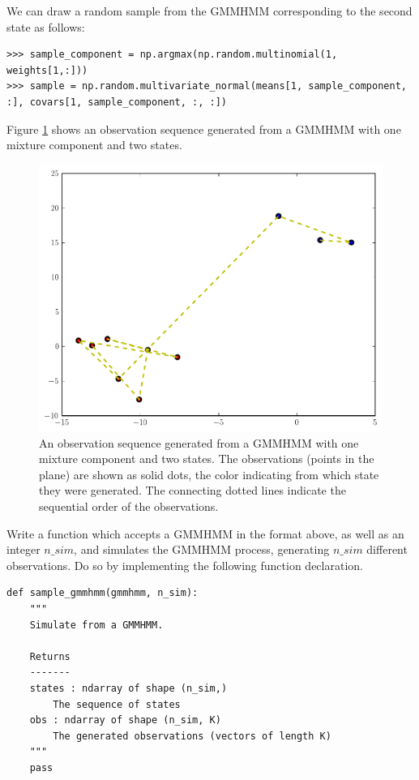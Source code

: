 We can draw a random sample from the GMMHMM corresponding to the second state as follows:
\begin{lstlisting}
>>> sample_component = np.argmax(np.random.multinomial(1, weights[1,:]))
>>> sample = np.random.multivariate_normal(means[1, sample_component, :], covars[1, sample_component, :, :])
\end{lstlisting}

Figure \ref{fig:samples} shows an observation sequence generated from a GMMHMM with one mixture component and two states.

\begin{figure}
\centering
\includegraphics[width=\textwidth]{samples}
\caption{An observation sequence generated from a GMMHMM with one mixture component and two states.
The observations (points in the plane) are shown as solid dots, the color indicating from which
state they were generated. The connecting dotted lines indicate the sequential order of the observations.}
\label{fig:samples}
\end{figure}

\begin{problem}
Write a function which accepts a GMMHMM in the format above, as well as an integer $n\_sim$, and simulates the GMMHMM process, generating $n\_sim$ different observations.
Do so by implementing the following function declaration.
\begin{lstlisting}
def sample_gmmhmm(gmmhmm, n_sim):
    """
    Simulate from a GMMHMM.

    Returns
    -------
    states : ndarray of shape (n_sim,)
        The sequence of states
    obs : ndarray of shape (n_sim, K)
        The generated observations (vectors of length K)
    """
    pass
\end{lstlisting}
\end{problem}

